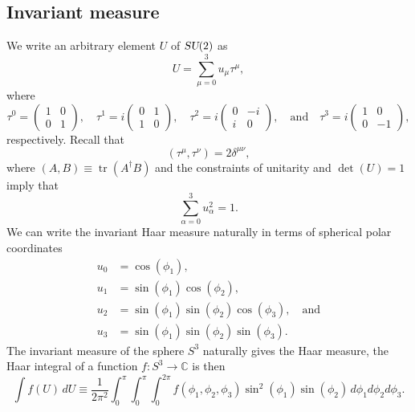\documentclass[12pt]{amsart}
\newcommand{\tr}{\operatorname{tr}}
\def\su2{\textsl{SU}(2)}
\theoremstyle{definition}
\theoremstyle{remark}
\numberwithin{equation}{section}
\begin{document}
\subsection{Invariant measure}
We write an arbitrary element $U$ of $\su2$ as 
\begin{equation}
	U = \sum_{\mu=0}^3 u_\mu \tau^\mu,
\end{equation}
where
\begin{equation}
	\tau^0 =\begin{pmatrix}1 & 0 \\ 0 & 1\end{pmatrix}, \quad \tau^1 = {i}\begin{pmatrix} 0& 1\\ 1 & 0\end{pmatrix}, \quad \tau^2 = i\begin{pmatrix} 0& -i\\ i & 0\end{pmatrix}, \quad \text{and} \quad \tau^3 = {i}\begin{pmatrix} 1 & 0\\ 0 & -1\end{pmatrix},
\end{equation}
respectively. Recall that
\begin{equation}
	(\tau^{\mu},\tau^{\nu}) = 2\delta^{\mu\nu}, 
\end{equation}
where $(A,B) \equiv \tr(A^\dag B)$ and the constraints of unitarity and $\det(U) = 1$ imply that
\begin{equation}
	\sum_{\alpha=0}^3 u_\alpha^2 = 1.
\end{equation}
We can write the invariant Haar measure naturally in terms of spherical polar coordinates
\begin{equation}
	\begin{split}
	u_0 &= \cos(\phi_1), \\
	u_1 &= \sin(\phi_1)\cos(\phi_2), \\
	u_2 &= \sin(\phi_1)\sin(\phi_2)\cos(\phi_3), \quad \text{and} \\
	u_3 &= \sin(\phi_1)\sin(\phi_2)\sin(\phi_3).
	\end{split}
\end{equation}
The invariant measure of the sphere $S^3$ naturally gives the Haar measure, the Haar integral of a function $f:S^3 \rightarrow \mathbb{C}$ is then
\begin{equation}
	\int f(U) \, dU \equiv \frac{1}{2\pi^2}\int_{0}^{\pi}\int_{0}^\pi  \int_{0}^{2\pi} f(\phi_1,\phi_2,\phi_3)\sin^2(\phi_1)\sin(\phi_2)\, d\phi_1 d\phi_2 d\phi_3.
\end{equation}
\end{document}
